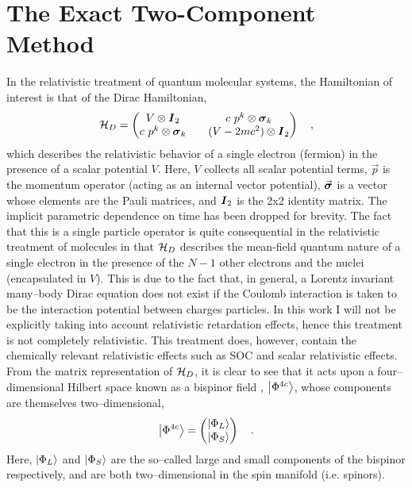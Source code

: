\section{The Exact Two-Component Method}
\label{sec:X2C}

In the relativistic treatment of quantum molecular systems, the Hamiltonian
of interest is that of the Dirac Hamiltonian,
\begin{equation}
\mathcal{H}_D = 
\begin{pmatrix}
  V \otimes \boldsymbol{I}_2 && c \text { } p^k \otimes \boldsymbol{\sigma}_k \\
  c \text { } p^k \otimes \boldsymbol{\sigma}_k && (V - 2mc^2) \otimes \boldsymbol{I}_2
\end{pmatrix} \quad ,
\label{eq:DiracHam}
\end{equation}
which describes the relativistic behavior of a single electron (fermion) in the
presence of a scalar potential $V$. Here, $V$ collects all scalar potential
terms, $\vec{p}$ is the momentum operator (acting as an internal vector
potential), $\vec{\boldsymbol{\sigma}}$ is a vector whose elements are the Pauli
matrices, and $\boldsymbol{I}_2$ is the 2x2 identity matrix. The implicit parametric
dependence on time has been dropped for brevity. The fact that this is a single
particle operator is quite consequential in the relativistic treatment of
molecules in that $\mathcal{H}_D$ describes the mean-field quantum nature of a
single electron in the presence of the $N-1$ other electrons and the nuclei
(encapsulated in $V$). This is due to the fact that, in general, a Lorentz
invariant many--body Dirac equation does not exist if the Coulomb interaction is
taken to be the interaction potential between charges particles. In this work I
will not be explicitly taking into account relativistic retardation effects,
hence this treatment is not completely relativistic. This treatment does,
however, contain the chemically relevant relativistic effects such as
SOC and  scalar relativistic effects.
From the matrix representation of $\mathcal{H}_D$, it is clear to see that it
acts upon a four--dimensional Hilbert space known as a bispinor field ,
$\left\vert \Phi^{4c} \right\rangle$, whose components are themselves two--dimensional,
\begin{equation}
\left\vert \Phi^{4c} \right\rangle = \begin{pmatrix}
 \left\vert \Phi_L \right\rangle \\ \left\vert \Phi_S \right\rangle
\end{pmatrix} \quad.
\end{equation}
Here, $\left\vert \Phi_L \right\rangle$ and $\left\vert \Phi_S \right\rangle$ are the so--called large and small
components of the bispinor respectively, and are both two--dimensional in the
spin manifold (i.e. spinors).

